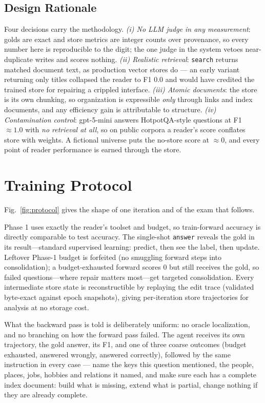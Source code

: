 \documentclass[conference]{IEEEtran}
\begin{document}
\subsection{Design Rationale}\label{sec:design}
Four decisions carry the methodology. \emph{(i) No LLM judge in any
measurement}: golds are exact and store metrics are integer counts over
provenance, so every number here is reproducible to the digit; the one judge
in the system vetoes near-duplicate writes and scores nothing.
\emph{(ii) Realistic retrieval}: \texttt{search} returns matched document
text, as production vector stores do --- an early variant returning only
titles collapsed the reader to F1 $0.0$ and would have credited the trained
store for repairing a crippled interface. \emph{(iii) Atomic documents}: the
store is its own chunking, so organization is expressible \emph{only}
through links and index documents, and any efficiency gain is attributable
to structure. \emph{(iv) Contamination control}: gpt-5-mini answers
HotpotQA-style questions at F1 $\approx 1.0$ with \emph{no retrieval at
all}, so on public corpora a reader's score conflates store with weights. A
fictional universe puts the no-store score at $\approx 0$, and every point
of reader performance is earned through the store.

\section{Training Protocol}
Fig.~\ref{fig:protocol} gives the shape of one iteration and of the exam
that follows.

Phase 1 uses exactly the reader's toolset and budget, so train-forward accuracy is
directly comparable to test accuracy. The single-shot \texttt{answer} reveals the gold
in its result---standard supervised learning: predict, then see the label, then
update. Leftover Phase-1 budget is forfeited (no smuggling forward steps into
consolidation); a budget-exhausted forward scores $0$ but still receives the gold, so
failed questions---where repair matters most---get targeted consolidation.
Every intermediate store state is reconstructible by replaying the edit trace
(validated byte-exact against epoch snapshots), giving per-iteration store
trajectories for analysis at no storage cost.

What the backward pass is told is deliberately uniform: no oracle
localization, and no branching on how the forward pass failed. The agent
receives its own trajectory, the gold answer, its F1, and one of three
coarse outcomes (budget exhausted, answered wrongly, answered correctly),
followed by the same instruction in every case --- name the keys this
question mentioned, the people, places, jobs, hobbies and relations it
named, and make sure each has a complete index document: build what is
missing, extend what is partial, change nothing if they are already
complete.
\end{document}
